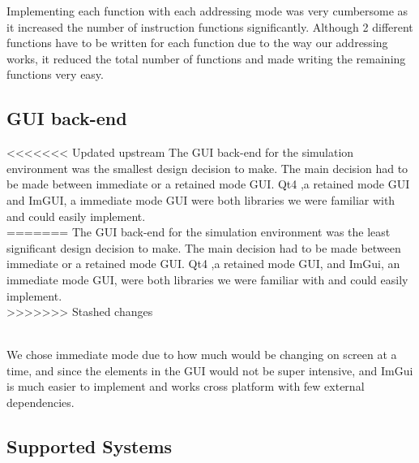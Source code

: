 \documentclass[conference]{IEEEtran}
\begin{document}
Implementing each function with each addressing mode was very cumbersome as it increased the number of instruction functions significantly. Although 2 different functions have to be written for each function due to the way our addressing works, it reduced the total number of functions and made writing the remaining functions very easy. 

\subsection{GUI back-end}

<<<<<<< Updated upstream
The GUI back-end for the simulation environment was the smallest design decision to make. The main decision had to be made between immediate or a retained mode GUI. Qt4 ,a retained mode GUI and ImGUI, a immediate mode GUI were both libraries we were familiar with and could easily implement. \\
=======
The GUI back-end for the simulation environment was the least significant design decision to make. The main decision had to be made between immediate or a retained mode GUI. Qt4 ,a retained mode GUI, and ImGui, an immediate mode GUI, were both libraries we were familiar with and could easily implement. \\
>>>>>>> Stashed changes

\\

We chose immediate mode due to how much would be changing on screen at a time, and since the elements in the GUI would not be super intensive, and ImGui is much easier to implement and works cross platform with few external dependencies.




\subsection{Supported Systems}
\end{document}
